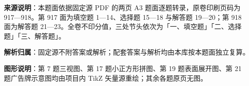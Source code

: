 

\begin{gknotice}
\textbf{来源说明}：本题面依据固定源 PDF 的两页 A3 题面逐题转录，原卷印刷页码为 917—918。第 917 面为填空题 1—14、选择题 15—18 与解答题 19—20；第 918 面为解答题 21—23。全卷不印分值，三处节头依次为「一、填空题」「二、选择题」「三、解答题」。

\textbf{解析归属}：固定源不附答案或解析；配套答案与解析均由本库按本题面独立复算。

\textbf{图形说明}：第 7 题三视图、第 17 题小正方形拼图、第 19 题表面展开图、第 21 题广告牌示意图均由项目内 TikZ 矢量源重绘；其余各题原页无图。
\end{gknotice}


